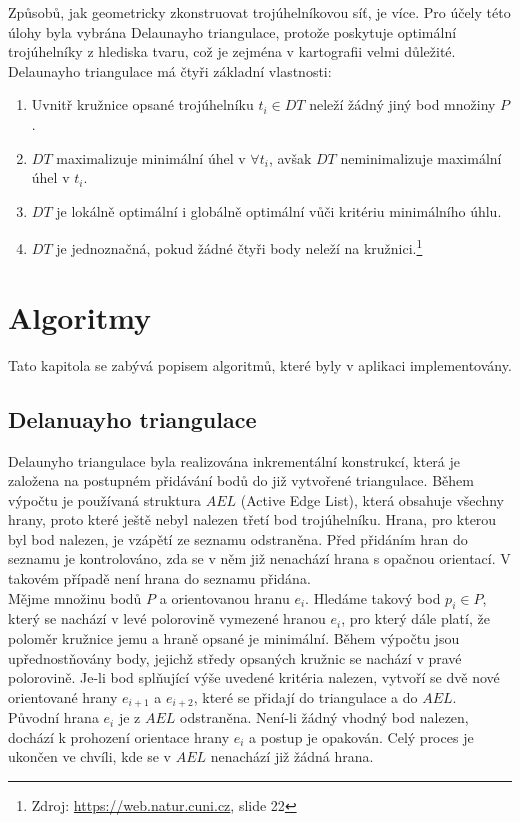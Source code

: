 \documentclass[a4paper, 12pt]{article}
\begin{document}
Způsobů, jak geometricky zkonstruovat trojúhelníkovou síť, je více. Pro účely této úlohy byla vybrána Delaunayho triangulace, protože poskytuje optimální trojúhelníky z hlediska tvaru, což je zejména v kartografii velmi důležité. Delaunayho triangulace má čtyři základní vlastnosti:
\begin{enumerate}
\item Uvnitř kružnice opsané trojúhelníku $t_i \in DT$ neleží žádný jiný bod množiny $P$.
\item $DT$ maximalizuje minimální úhel v $\forall t_i$, avšak $DT$ neminimalizuje maximální úhel v $t_i$.
\item $DT$ je lokálně optimální i globálně optimální vůči kritériu minimálního úhlu.
\item $DT$ je jednoznačná, pokud žádné čtyři body neleží na kružnici.\footnote{Zdroj: \href{https://web.natur.cuni.cz/~bayertom/images/courses/Adk/adk5.pdf}{https://web.natur.cuni.cz}, slide 22}
\end{enumerate}


\section{Algoritmy}
Tato kapitola se zabývá popisem algoritmů, které byly v aplikaci implementovány. 

\subsection{Delanuayho triangulace}
Delaunyho triangulace byla realizována inkrementální konstrukcí, která je založena na postupném přidávání bodů do již vytvořené triangulace. Během výpočtu je používaná struktura $AEL$ (Active Edge List), která obsahuje všechny hrany, proto které ještě nebyl nalezen třetí bod trojúhelníku. Hrana, pro kterou byl bod nalezen, je vzápětí ze seznamu odstraněna. Před přidáním hran do seznamu je kontrolováno, zda se v něm již nenachází hrana s opačnou orientací. V takovém případě není hrana do seznamu přidána.\\

Mějme množinu bodů $P$ a orientovanou hranu $e_i$. Hledáme takový bod $p_i \in P$, který se nachází v levé polorovině vymezené hranou $e_i$, pro který dále platí, že poloměr kružnice jemu a hraně opsané je minimální. Během výpočtu jsou upřednostňovány body, jejichž středy opsaných kružnic se nachází v pravé polorovině. Je-li bod splňující výše uvedené kritéria nalezen, vytvoří se dvě nové orientované hrany $e_{i+1}$ a $e_{i+2}$, které se přidají do triangulace a do $AEL$. Původní hrana $e_i$ je z $AEL$ odstraněna. Není-li žádný vhodný bod nalezen, dochází k prohození orientace hrany $e_i$ a postup je opakován. Celý proces je ukončen ve chvíli, kde se v $AEL$ nenachází již žádná hrana. \\ 
\end{document}

